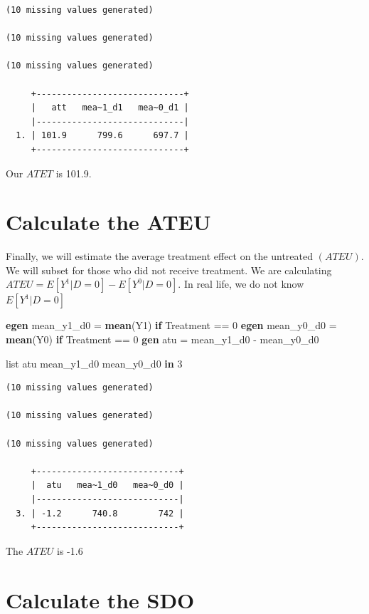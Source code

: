 \documentclass[
]{book}
\newenvironment{Shaded}{\begin{snugshade}}{\end{snugshade}}
\newcommand{\KeywordTok}[1]{\textcolor[rgb]{0.13,0.29,0.53}{\textbf{#1}}}
\newcommand{\NormalTok}[1]{#1}
\newcommand{\OtherTok}[1]{\textcolor[rgb]{0.56,0.35,0.01}{#1}}
\begin{document}
\begin{verbatim}
(10 missing values generated)

(10 missing values generated)

(10 missing values generated)

     +-----------------------------+
     |   att   mea~1_d1   mea~0_d1 |
     |-----------------------------|
  1. | 101.9      799.6      697.7 |
     +-----------------------------+
\end{verbatim}

Our \(ATET\) is 101.9.

\section{Calculate the ATEU}\label{calculate-the-ateu}

Finally, we will estimate the average treatment effect on the untreated \((ATEU)\). We will subset for those who did not receive treatment. We are calculating \(ATEU=E[Y^1|D=0]-E[Y^0|D=0]\). In real life, we do not know \(E[Y^1|D=0]\)

\begin{Shaded}
\begin{Highlighting}[]
\KeywordTok{egen}\NormalTok{ mean\_y1\_d0 = }\KeywordTok{mean}\NormalTok{(Y1) }\KeywordTok{if}\NormalTok{ Treatment == 0}
\KeywordTok{egen}\NormalTok{ mean\_y0\_d0 = }\KeywordTok{mean}\NormalTok{(Y0) }\KeywordTok{if}\NormalTok{ Treatment == 0}
\KeywordTok{gen}\NormalTok{ atu = mean\_y1\_d0 {-} mean\_y0\_d0}

\OtherTok{list}\NormalTok{ atu mean\_y1\_d0 mean\_y0\_d0 }\KeywordTok{in}\NormalTok{ 3}
\end{Highlighting}
\end{Shaded}

\begin{verbatim}
(10 missing values generated)

(10 missing values generated)

(10 missing values generated)

     +----------------------------+
     |  atu   mea~1_d0   mea~0_d0 |
     |----------------------------|
  3. | -1.2      740.8        742 |
     +----------------------------+
\end{verbatim}

The \(ATEU\) is -1.6

\section{Calculate the SDO}\label{calculate-the-sdo}
\end{document}
